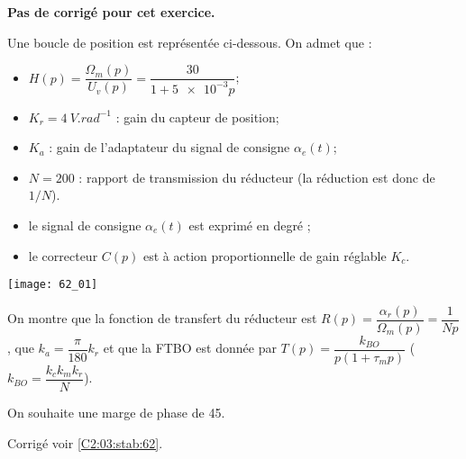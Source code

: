 \normaltrue \difficilefalse \tdifficilefalse
\correctionfalse

\setcounter{numques}{0}

\ifcorrection
\else
\textbf{Pas de corrigé pour cet exercice.}
\fi


\ifprof 
\else
Une boucle de position est représentée ci-dessous. On admet que :  
\begin{itemize}
\item $H(p)=\dfrac{\Omega_m(p)}{U_v(p)}=\dfrac{30}{1+\num{5e-3}p}$;
\item $K_r = \SI{4}{V.rad^{-1}}$ : gain du capteur de position;
\item $K_a$ : gain de l’adaptateur du signal de consigne $\alpha_e(t)$; 
\item $N=200$ : rapport de transmission du réducteur (la réduction est donc de $1/N$).
\item le signal de consigne $\alpha_e(t)$ est exprimé en degré ; 
\item le correcteur $C(p)$ est à action proportionnelle de gain réglable $K_c$. 
\end{itemize}


\begin{center}
\texttt{[image: 62\_01]}
\end{center}
 \fi
 
 
 On montre que la fonction de transfert du réducteur est $R(p)=\dfrac{\alpha_r(p)}{\Omega_m(p)}=\dfrac{1}{Np}$, que  $k_a=\dfrac{\pi}{180}k_r$ et que la FTBO est donnée par $T(p)=\dfrac{k_{BO}}{p\left(1+\tau_m p\right)}$ ($k_{BO}=\dfrac{k_c k_m k_r}{N}$).
 
 
 On souhaite une marge de phase de 45\degres.
\ifprof
\else 
\fi

\ifprof
\else 
\fi

\ifprof
\else 
\fi

 

\ifprof
\else

\noindent\footnotesize
{}
\normalsize

\begin{flushright}
\footnotesize{Corrigé  voir \ref{C2:03:stab:62}.}
\end{flushright}%
\fi